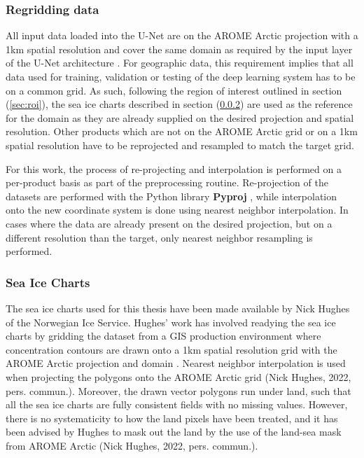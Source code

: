 \documentclass[../main/thesis]{subfiles}
\begin{document}
\subsubsection{Regridding data}
\label{sec:regrid}
All input data loaded into the U-Net are on the AROME Arctic projection with a 1km spatial resolution and cover the same domain as required by the input layer of the U-Net architecture \citep{Ronneberger2015}. For geographic data, this requirement implies that all data used for training, validation or testing of the deep learning system has to be on a common grid. As such, following the region of interest outlined in section (\ref{sec:roi}), the sea ice charts described in section (\ref{sec:data_seaicecharts}) are used as the reference for the domain as they are already supplied on the desired projection and spatial resolution. Other products which are not on the AROME Arctic grid \citep{Mueller2017} or on a 1km spatial resolution \citep{Dinessen2020} have to be reprojected and resampled to match the target grid.

For this work, the process of re-projecting and interpolation is performed on a per-product basis as part of the preprocessing routine. Re-projection of the datasets are performed with the Python library \textbf{Pyproj} \citep{Snow2022}, while interpolation onto the new coordinate system is done using nearest neighbor interpolation. In cases where the data are already present on the desired projection, but on a different resolution than the target, only nearest neighbor resampling is performed.

\subsubsection{Sea Ice Charts}
\label{sec:data_seaicecharts}
The sea ice charts used for this thesis have been made available by Nick Hughes of the Norwegian Ice Service. Hughes' work has involved readying the sea ice charts by gridding the dataset from a GIS production environment \citep{Dinessen2020} where concentration contours are drawn onto a 1km spatial resolution grid with the AROME Arctic projection and domain \citep{Mueller2017}. Nearest neighbor interpolation is used when projecting the polygons onto the AROME Arctic grid (Nick Hughes, 2022, pers. commun.). Moreover, the drawn vector polygons run under land, such that all the sea ice charts are fully consistent fields with no missing values. However, there is no systematicity to how the land pixels have been treated, and it has been advised by Hughes to mask out the land by the use of the land-sea mask from AROME Arctic (Nick Hughes, 2022, pers. commun.).
\end{document}

